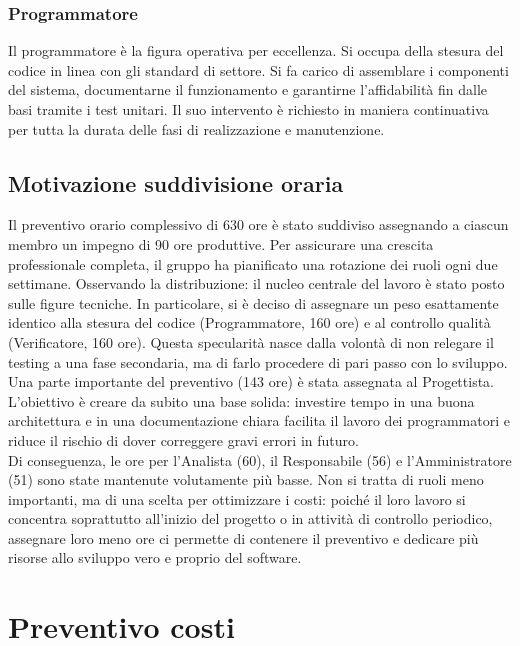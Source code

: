 \documentclass[a4paper,12pt]{article}
\begin{document}
\subsubsection{Programmatore}
Il programmatore è la figura operativa per eccellenza. Si occupa della stesura del codice in linea con gli standard di settore. Si fa carico di assemblare i componenti del sistema, documentarne il funzionamento e garantirne l'affidabilità fin dalle basi tramite i test unitari. Il suo intervento è richiesto in maniera continuativa per tutta la durata delle fasi di realizzazione e manutenzione.

\subsection{Motivazione suddivisione oraria }
Il preventivo orario complessivo di 630 ore è stato suddiviso assegnando a ciascun membro un impegno di 90 ore produttive. Per assicurare una crescita professionale completa, il gruppo ha pianificato una rotazione dei ruoli ogni due settimane.
Osservando la distribuzione: il nucleo centrale del lavoro è stato posto sulle figure tecniche. In particolare, si è deciso di assegnare un peso esattamente identico alla stesura del codice (Programmatore, 160 ore) e al controllo qualità (Verificatore, 160 ore). Questa specularità nasce dalla volontà di non relegare il testing a una fase secondaria, ma di farlo procedere di pari passo con lo sviluppo.
\\
Una parte importante del preventivo (143 ore) è stata assegnata al Progettista. L'obiettivo è creare da subito una base solida: investire tempo in una buona architettura e in una documentazione chiara facilita il lavoro dei programmatori e riduce il rischio di dover correggere gravi errori in futuro.
\\
Di conseguenza, le ore per l'Analista (60), il Responsabile (56) e l'Amministratore (51) sono state mantenute volutamente più basse. Non si tratta di ruoli meno importanti, ma di una scelta per ottimizzare i costi: poiché il loro lavoro si concentra soprattutto all'inizio del progetto o in attività di controllo periodico, assegnare loro meno ore ci permette di contenere il preventivo e dedicare più risorse allo sviluppo vero e proprio del software.

\section{Preventivo costi}
\end{document}
